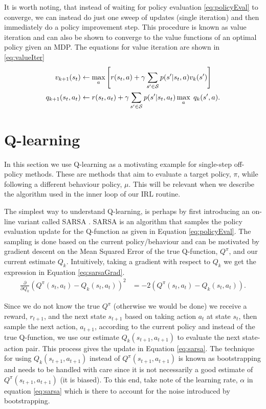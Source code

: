 \documentclass{report}
\numberwithin{equation}{section}
\numberwithin{figure}{section}
\numberwithin{table}{section}
\numberwithin{algorithm}{section}
\begin{document}
It is worth noting, that instead of waiting for policy evaluation 
\ref{eq:policyEval} to converge, we can instead do just one sweep 
of updates (single iteration) and then immediately do a policy 
improvement step. This procedure is known as value iteration and 
can also be shown to converge to the value functions of an 
optimal policy given an MDP. The equations for value iteration 
are shown in \ref{eq:valueIter}
\begin{align}\label{eq:valueIter}
  v_{k+1}(s_t)&\gets\max_a \left[r(s_t, a) 
  + \gamma \sum_{s'\in\mathcal{S}}p(s'|s_t, a)v_{k}(s')\right]\notag\\
  q_{k+1}(s_t, a_t)&\gets r(s_t, a_t) 
  + \gamma \sum_{s'\in\mathcal{S}}p(s'|s_t, a_t)\max_a\; q_{k}(s', a).
\end{align}


\section{Q-learning}\label{sec:Qlearning}
In this section we use Q-learning \citep{QlearningWatkins1992} 
as a motivating example 
for single-step off-policy methods. These are methods 
that aim to evaluate a target policy, $\pi$, while following 
a different behaviour policy, $\mu$. This will be relevant when 
we describe the algorithm \citep{SAC2} 
used in the inner loop of our IRL routine.

The simplest way to understand Q-learning, is perhaps by 
first introducing an on-line variant called SARSA \citep{SARSA}. 
SARSA is an algorithm that samples the policy evaluation update 
for the Q-function as given in Equation \ref{eq:policyEval}.
The sampling is done based on the current policy/behaviour and can 
be motivated by gradient descent on the Mean Squared Error of 
the true Q-function, $Q^{\pi}$, and our current estimate $Q_{k}$.
Intuitively, taking a gradient with respect to $Q_{k}$ we get the 
expression in Equation \ref{eq:sarsaGrad}.
\begin{align}\label{eq:sarsaGrad}
  \frac{\partial}{\partial Q_{k}}(Q^{\pi}(s_t, a_t) - Q_{k}(s_t, a_t))^2&=-2(Q^{\pi}(s_t, a_t) - Q_{k}(s_t,a_t)).
\end{align}

Since we do not know the true $Q^{\pi}$ (otherwise we would be done) 
we receive a reward, $r_{t+1}$, and the next state $s_{t+1}$ 
based on taking action $a_t$ at state $s_t$, then sample the next 
action, $a_{t+1}$, according to the current policy and instead of the 
true Q-function, we use our estimate $Q_{k}(s_{t+1}, a_{t+1})$ to evaluate 
the next state-action pair. This process gives the update in 
Equation \ref{eq:sarsa}.
The technique for using $Q_{k}(s_{t+1}, a_{t+1})$ instead 
of $Q^{\pi}(s_{t+1}, a_{t+1})$ is known as bootstrapping and needs to be 
handled with care since it is not 
necessarily a good estimate of $Q^{\pi}(s_{t+1}, a_{t+1})$ (it is biased). 
To this end, take note of the learning rate, $\alpha$ in equation 
\ref{eq:sarsa} which is there to account for the noise introduced 
by bootstrapping.
\end{document}
